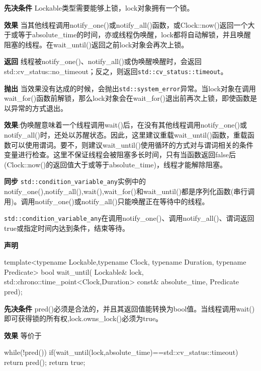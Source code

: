 \textbf{先决条件}
Lockable类型需要能够上锁，lock对象拥有一个锁。

\textbf{效果}
当其他线程调用notify\_one()或notify\_all()函数，或Clock::now()返回一个大于或等于absolute\_time的时间，亦或线程伪唤醒，lock都将自动解锁，并且唤醒阻塞的线程。在wait\_until()返回之前lock对象会再次上锁。

\textbf{返回}
线程被notify\_one()、notify\_all()或伪唤醒唤醒时，会返回std::cv\_status::no\_timeout；反之，则返回\texttt{std::cv\_status::timeout}。

\textbf{抛出}
当效果没有达成的时候，会抛出\texttt{std::system\_error}异常。当lock对象在调用wait\_for()函数前解锁，那么lock对象会在wait\_for()退出前再次上锁，即使函数是以异常的方式退出。

\textbf{效果}:伪唤醒意味着一个线程调用wait()后，在没有其他线程调用notify\_one()或notify\_all()时，还处以苏醒状态。因此，这里建议重载wait\_until()函数，重载函数可以使用谓词。要不，则建议wait\_until()使用循环的方式对与谓词相关的条件变量进行检查。这里不保证线程会被阻塞多长时间，只有当函数返回false后(Clock::now()的返回值大于或等于absolute\_time)，线程才能解除阻塞。

\textbf{同步}
\texttt{std::condition\_variable\_any}实例中的notify\_one(),notify\_all(),wait(),wait\_for()和wait\_until()都是序列化函数(串行调用)。调用notify\_one()或notify\_all()只能唤醒正在等待中的线程。


\texttt{std::condition\_variable\_any}在调用notify\_one()、调用notify\_all()、谓词返回true或指定时间内达到条件，结束等待。

\textbf{声明}

\begin{cpp}
template<typename Lockable,typename Clock,
    typename Duration, typename Predicate>
bool wait_until(
    Lockable& lock,
    std::chrono::time_point<Clock,Duration> const& absolute_time,
    Predicate pred);
\end{cpp}

\textbf{先决条件}
pred()必须是合法的，并且其返回值能转换为bool值。当线程调用wait()即可获得锁的所有权,lock.owns\_lock()必须为true。

\textbf{效果}
等价于

\begin{cpp}
while(!pred())
{
  if(wait_until(lock,absolute_time)==std::cv_status::timeout)
    return pred();
}
return true;
\end{cpp}

